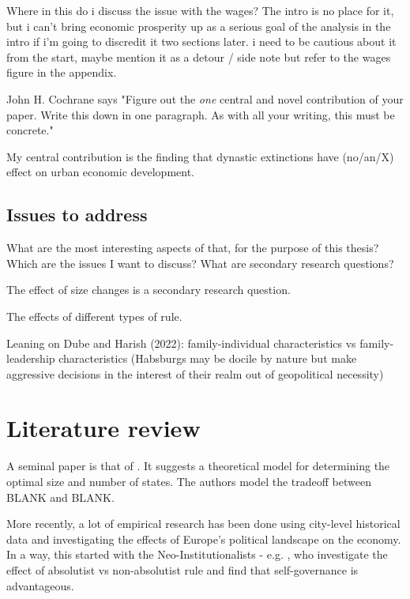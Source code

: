 \documentclass{article}
\begin{document}
Where in this do i discuss the issue with the wages? The intro is no place for it, but i can't bring economic prosperity up as a serious goal of the analysis in the intro if i'm going to discredit it two sections later. i need to be cautious about it from the start, maybe mention it as a detour / side note but refer to the wages figure in the appendix.

John H. Cochrane says "Figure out the \textit{one} central and novel contribution of your paper. Write this down in one paragraph. As with all your writing, this must be concrete."

My central contribution is the finding that dynastic extinctions have (no/an/X) effect on urban economic development.


\subsection{Issues to address}

What are the most interesting aspects of that, for the purpose of this thesis? Which are the issues I want to discuss? What are secondary research questions?

The effect of size changes is a secondary research question.

The effects of different types of rule.

Leaning on Dube and Harish (2022): family-individual characteristics vs family-leadership characteristics (Habsburgs may be docile by nature but make aggressive decisions in the interest of their realm out of geopolitical necessity)


\section{Literature review}

A seminal paper is that of \cite{as1997}. It suggests a theoretical model for determining the optimal size and number of states. The authors model the tradeoff between BLANK and BLANK.

More recently, a lot of empirical research has been done using city-level historical data and investigating the effects of Europe's political landscape on the economy. In a way, this started with the Neo-Institutionalists - e.g. \cite{delong1993}, who investigate the effect of absolutist vs non-absolutist rule and find that self-governance is advantageous. 
\end{document}
